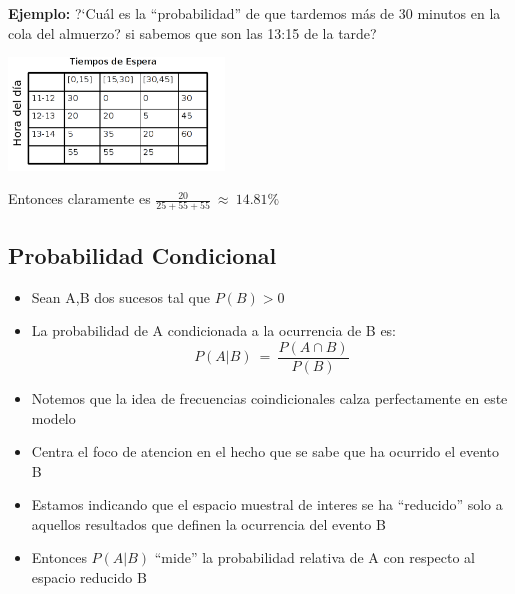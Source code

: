 \textbf{Ejemplo:} ?`Cu\'al es la ``probabilidad'' de que tardemos m\'as de 30 minutos en la cola del almuerzo? si sabemos que son las
13:15 de la tarde?
\begin{center}
	\includegraphics[height=3cm]{images/cap6_ej1_1}
\end{center}
Entonces claramente es $\frac{20}{25+55+55}\ \approx\ 14.81\%$
\subsection{Probabilidad Condicional}
\begin{itemize}
	\item Sean A,B dos sucesos tal que $P(B)>0$
	\item La probabilidad de A condicionada a la ocurrencia de B es:
	$$P(A|B)\ =\ \frac{P(A\cap B)}{P(B)}$$
	\item Notemos que la idea de frecuencias coindicionales calza perfectamente en este modelo
	\item Centra el foco de atencion en el hecho que se sabe que ha ocurrido el evento B
	\item Estamos indicando que el espacio muestral de interes se ha ``reducido'' solo a
	aquellos resultados que definen la ocurrencia del evento B
	\item Entonces $P(A|B)$ ``mide'' la probabilidad relativa de A con respecto al espacio
	reducido B
\end{itemize}
